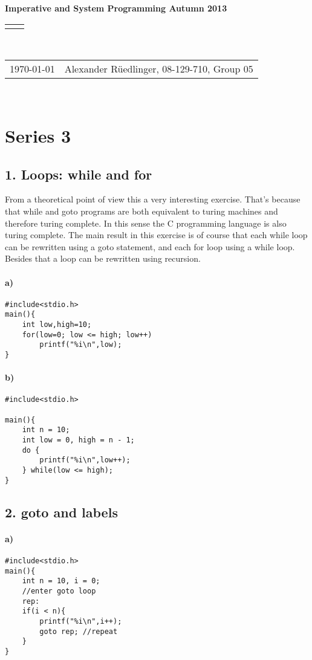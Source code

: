 \documentclass[12pt]{article}
\renewcommand{\title}[1]{\textbf{#1}\\}
\renewcommand{\line}{\begin{tabularx}{\textwidth}{X>{\raggedleft}X}\hline\\\end{tabularx}\\[-0.5cm]}
\newcommand{\leftright}[2]{\begin{tabularx}{\textwidth}{X>{\raggedleft}X}#1%
& #2\\\end{tabularx}\\[-0.5cm]}
\begin{document}
\title{Imperative and System Programming Autumn 2013}
\line
\leftright{\today}{Alexander Rüedlinger, 08-129-710, Group 05} %
\section*{Series 3}

\subsection*{1. Loops: while and for}
From a theoretical point of view this a very interesting exercise.  That's because that while and goto programs are both equivalent to turing machines and therefore turing complete. In this sense the C programming language is also turing complete.
The main result in this exercise is of course that each while loop can be rewritten using a goto statement, and each for loop using a while loop. Besides that a loop can be rewritten using recursion.

\paragraph*{a)}\quad
\begin{lstlisting}
#include<stdio.h>
main(){
	int low,high=10;	
	for(low=0; low <= high; low++)
		printf("%i\n",low);
}
\end{lstlisting}
\paragraph*{b)}
\quad
\begin{lstlisting}
#include<stdio.h>

main(){
	int n = 10;
	int low = 0, high = n - 1;
	do {
		printf("%i\n",low++);
	} while(low <= high);
}
\end{lstlisting}

\subsection*{2. goto and labels}
\paragraph*{a)}
\quad
\begin{lstlisting}
#include<stdio.h>
main(){
	int n = 10, i = 0;	
	//enter goto loop
	rep:
	if(i < n){	
		printf("%i\n",i++);		
		goto rep; //repeat
	}
}
\end{lstlisting}
\end{document}

